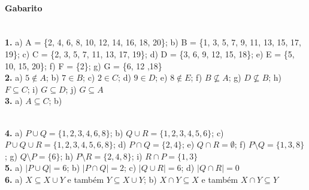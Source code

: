 \documentclass[a4paper,twocolumn,12pt]{article}
\begin{document}
{\footnotesize \color{darkgray}
\paragraph*{Gabarito} \hspace*{\fill}\\
\textbf{1.} a) A = \{2, 4, 6, 8, 10, 12, 14, 16, 18, 20\}; b) B = \{1, 3, 5, 7, 9, 11, 13, 15, 17, 19\}; c) C = \{2, 3, 5, 7, 11, 13, 17, 19\}; d) D = \{3, 6, 9, 12, 15, 18\}; e) E = \{5, 10, 15, 20\}; f) F = \{2\}; g) G = \{6, 12 ,18\}\\
\textbf{2.} a) \(5\notin A\); b) \(7\in B\); c) \(2\in C\); d) \(9\in D\); e) \(8\notin E\); f) \(B\not\subseteq A\); g) \(D\not\subseteq B\); h) \(F\subseteq C\); i) \(G\subseteq D\); j) \(G\subseteq A\)\\
\textbf{3.} a) \(A \subseteq C\); b) \\
\textbf{4.} a) \(P\cup Q = \{1,2,3,4,6,8\}\); b) \(Q\cup R = \{1,2,3,4,5,6\}\); c) \(P\cup Q \cup R = \{1,2,3,4,5,6,8\}\); d) \(P\cap Q = \{2,4\}\); e) \(Q\cap R = \emptyset\); f) \(P\setminus Q = \{1,3,8\}\); g) \(Q\setminus P = \{6\}\); h) \(P\setminus R = \{2,4,8\}\); i) \(R\cap P = \{1,3\}\)\\
\textbf{5.} a) \(|P\cup Q| = 6\); b) \(|P\cap Q| = 2\); c) \(|Q\cup R| = 6\); d) \(|Q\cap R| = 0\)\\
\textbf{6.} a) \(X\subseteq X\cup Y\) e também $Y\subseteq X\cup Y$; b) \(X\cap Y\subseteq X\) e também \(X\cap Y\subseteq Y\)

}
\end{document}

